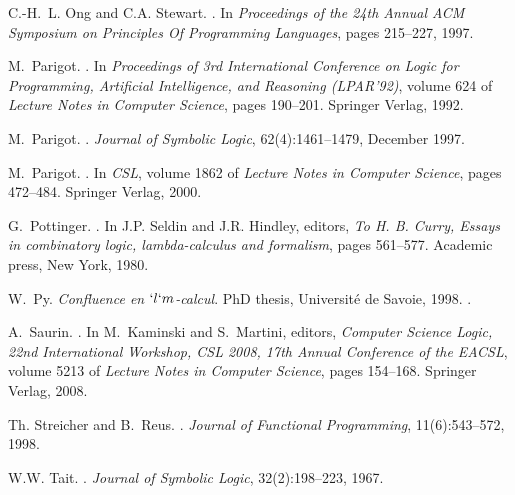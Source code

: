 \documentclass{CSML}
\begin{document}
\begin{thebibliography}{10}
C.-H.~L. Ong and C.A. Stewart.
.
\newblock In \emph{Proceedings of the 24th Annual {ACM} Symposium on Principles
 Of Programming Languages}, pages 215--227, 1997.

M.~Parigot.
.
\newblock In \emph{Proceedings of 3rd International Conference on Logic for
 Programming, Artificial Intelligence, and Reasoning (LPAR'92)}, volume 624 of
 \emph{Lecture Notes in Computer Science}, pages 190--201. Springer Verlag,
 1992.

M.~Parigot.
.
\newblock \emph{Journal of Symbolic Logic}, 62(4):1461--1479, December 1997.

M.~Parigot.
.
\newblock In \emph{CSL}, volume 1862 of \emph{Lecture Notes in Computer Science},
 pages 472--484. Springer Verlag, 2000.

G.~Pottinger.
.
\newblock In J.P. Seldin and J.R. Hindley, editors, \emph{To H. B. Curry, Essays
 in combinatory logic, lambda-calculus and formalism}, pages 561--577.
 Academic press, New York, 1980.

W.~Py.
\newblock \emph{{Confluence en $`l`m$-calcul}}.
\newblock PhD thesis, {Universit\'e de Savoie}, 1998.
.

A.~Saurin.
.
\newblock In M.~Kaminski and S.~Martini, editors, \emph{{Computer Science Logic,
 22nd International Workshop, CSL 2008, 17th Annual Conference of the EACSL}},
 volume 5213 of \emph{Lecture Notes in Computer Science}, pages 154--168.
 Springer Verlag, 2008.

Th. Streicher and B.~Reus.
.
\newblock \emph{Journal of Functional Programming}, 11(6):543--572, 1998.

W.W. Tait.
.
\newblock \emph{Journal of Symbolic Logic}, 32(2):198--223, 1967.

 \end{thebibliography}

 
\end{document}
